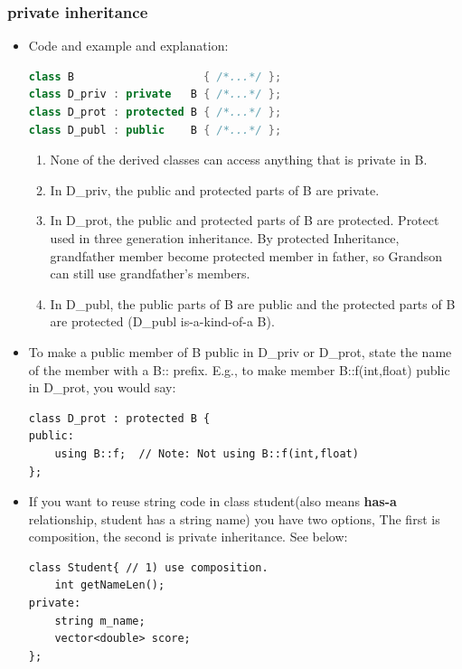\documentclass[a4paper,11pt,twoside]{book}
\begin{document}
\subsubsection{private inheritance}
\begin{itemize}
	\item 	Code and example and explanation:
\begin{lstlisting}[frame=single, language=c++]
class B                    { /*...*/ };
class D_priv : private   B { /*...*/ };
class D_prot : protected B { /*...*/ };
class D_publ : public    B { /*...*/ };
\end{lstlisting}
	
	\begin{enumerate}
		\item None of the derived classes can access anything that is private in B.
		
		\item In D\_priv, the public and protected parts of B are private.
		
		\item In D\_prot, the public and protected parts of B are protected. Protect used in three generation inheritance. By protected Inheritance, grandfather member become protected member in father, so Grandson can still use grandfather's members.
		
		\item In D\_publ, the public parts of  B are public and the protected parts of B are protected (D\_publ is-a-kind-of-a B).
		
	\end{enumerate}

	\item To make a public member of B public in D\_priv or D\_prot, state the name of the member with a B:: prefix. E.g., to make member B::f(int,float) public in D\_prot, you would say:
\begin{lstlisting}[numbers=none]
class D_prot : protected B {
public:
	using B::f;  // Note: Not using B::f(int,float)
};
\end{lstlisting}



\item If you want to reuse string code in class student(also means \textbf{has-a} relationship, student has a string name) you have two options, The first is composition,  the second is private inheritance. See below:
\begin{lstlisting}[numbers=none]
class Student{ // 1) use composition.
	int getNameLen();
private:
	string m_name;
	vector<double> score;
};


\end{lstlisting}
\end{itemize}
\end{document}
